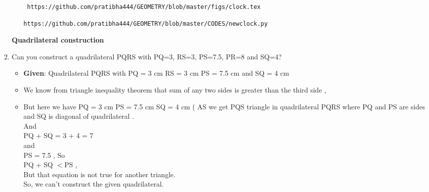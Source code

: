 \documentclass[journal,12pt,twocolumn]{IEEEtran}
\begin{document}
\begin{enumerate}[label=\arabic*]
\begin{itemize}
	
\begin{lstlisting}
 https://github.com/pratibha444/GEOMETRY/blob/master/figs/clock.tex
 \end{lstlisting} 
 \begin{lstlisting}
https://github.com/pratibha444/GEOMETRY/blob/master/CODES/newclock.py
\end{lstlisting}
\end{itemize}             





\textbf{Quadrilateral construction}\\

\item Can you construct a quadrilateral PQRS with PQ=3, RS=3, PS=7.5, PR=8 and SQ=4?\\
\begin{itemize}
\item \textbf{Given}:  Quadrilateral PQRS with PQ = 3 cm RS =  3 cm PS = 7.5 cm and SQ = 4 cm\\

\item We know from triangle inequality theorem that sum of any two sides is greater than the third side ,\\
\item But here we have PQ = 3 cm PS =  7.5 cm SQ = 4 cm ( AS we get PQS triangle in quadrilateral PQRS where PQ and PS are sides and SQ is diagonal of quadrilateral . \\

And\\

PQ + SQ = 3 + 4 = 7\\

and\\

PS = 7.5 , So\\

PQ + SQ $<$PS ,\\
 But that equation is not true for another triangle.\\
So, we can't construct the given quadrilateral.
\end{itemize}





\end{enumerate}
\end{document}
